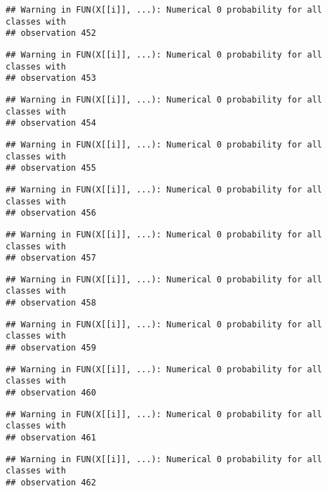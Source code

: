 \documentclass[
]{article}
\begin{document}
\begin{verbatim}
## Warning in FUN(X[[i]], ...): Numerical 0 probability for all classes with
## observation 452
\end{verbatim}

\begin{verbatim}
## Warning in FUN(X[[i]], ...): Numerical 0 probability for all classes with
## observation 453
\end{verbatim}

\begin{verbatim}
## Warning in FUN(X[[i]], ...): Numerical 0 probability for all classes with
## observation 454
\end{verbatim}

\begin{verbatim}
## Warning in FUN(X[[i]], ...): Numerical 0 probability for all classes with
## observation 455
\end{verbatim}

\begin{verbatim}
## Warning in FUN(X[[i]], ...): Numerical 0 probability for all classes with
## observation 456
\end{verbatim}

\begin{verbatim}
## Warning in FUN(X[[i]], ...): Numerical 0 probability for all classes with
## observation 457
\end{verbatim}

\begin{verbatim}
## Warning in FUN(X[[i]], ...): Numerical 0 probability for all classes with
## observation 458
\end{verbatim}

\begin{verbatim}
## Warning in FUN(X[[i]], ...): Numerical 0 probability for all classes with
## observation 459
\end{verbatim}

\begin{verbatim}
## Warning in FUN(X[[i]], ...): Numerical 0 probability for all classes with
## observation 460
\end{verbatim}

\begin{verbatim}
## Warning in FUN(X[[i]], ...): Numerical 0 probability for all classes with
## observation 461
\end{verbatim}

\begin{verbatim}
## Warning in FUN(X[[i]], ...): Numerical 0 probability for all classes with
## observation 462
\end{verbatim}
\end{document}
